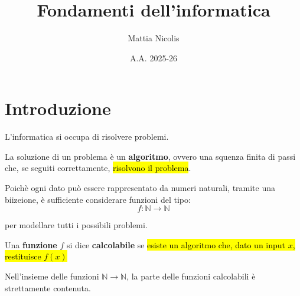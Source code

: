 \documentclass[a4paper, 12pt]{book}
\title{\textbf{Fondamenti dell'informatica}}
\author{Mattia Nicolis}
\date{A.A. 2025-26}
\begin{document}
    \maketitle

    \tableofcontents
    \markboth{}{}


    \chapter*{Introduzione}
    L'informatica si occupa di risolvere problemi.

    La soluzione di un problema è un \textbf{algoritmo}, ovvero una squenza finita di passi che, se seguiti correttamente, \hl{risolvono il problema}.

    Poichè ogni dato può essere rappresentato da numeri naturali, tramite una biizeione, è sufficiente considerare funzioni del tipo:
    \begin{equation*}
      f:\mathbb{N}\rightarrow\mathbb{N}
    \end{equation*}

    per modellare tutti i possibili problemi.

    \vspace{3mm}

    \begin{tcolorbox}[
      colback=cyan!5!white,
      colframe=blue!50!black,
      title=\textbf{Definizione - funzione calcolabile},
      coltitle=white,
      fonttitle=\bfseries,
      arc=3mm,
      boxrule=0.5pt,
      enhanced,
      breakable
    ]
      Una \textbf{funzione} $f$ si dice \textbf{calcolabile} se \hl{esiste un algoritmo che, dato un input $x$, restituisce $f(x)$}  
    \end{tcolorbox}

    \vspace{3mm}

    Nell'insieme delle funzioni $\mathbb{N}\rightarrow\mathbb{N}$, la parte delle funzioni calcolabili è strettamente contenuta.

    \vspace{3mm}
\end{document}
